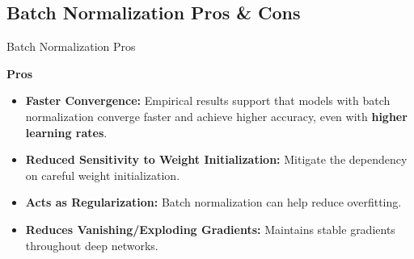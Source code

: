 \documentclass[serif, aspectratio=169]{beamer}
\begin{document}
\subsection{Batch Normalization Pros \& Cons}

\begin{frame}{Batch Normalization Pros}
	
	\textbf{Pros}
	
	\begin{itemize}
		
		\item \textbf{Faster Convergence:}  Empirical results support that models with batch normalization converge faster and achieve higher accuracy, even with \textbf{higher learning rates}.
		\item \textbf{Reduced Sensitivity to  Weight Initialization:} Mitigate the dependency on careful weight initialization.
		\item \textbf{Acts as Regularization:} Batch normalization can help reduce overfitting.
		\item \textbf{Reduces Vanishing/Exploding Gradients:} Maintains stable gradients throughout deep networks.
		
		
	\end{itemize}
\end{frame}
\end{document}
